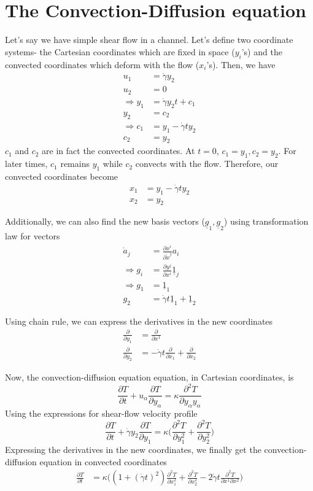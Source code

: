 \documentclass[11pt, letterpaper]{article}
\newcommand{\1}{\bm{1}}
\newcommand{\gd}{\dot \gamma}
\newcommand{\pd}[2]{\frac{\partial #1}{\partial #2}}
\newcommand{\vect}[1]{\underline{#1}} %
\newcommand{\p}[1]{\grave{#1}} %
\begin{document}
\section{The Convection-Diffusion equation}

Let's say we have simple shear flow in a channel. Let's define two coordinate systems- the Cartesian coordinates which are fixed in space ($y_i$'s) and the convected coordinates which deform with the flow ($x_i$'s). Then, we have
\begin{align*}
u_1 &= \gd y_2\\
u_2 &= 0 \\
\Rightarrow y_1 &= \gd y_2 t + c_1 \\
y_2 &= c_2 \\
\Rightarrow c_1 &= y_1 - \gd t y_2 \\
c_2 &= y_2
\end{align*}
$c_1$ and $c_2$ are in fact the convected coordinates. At $t=0$, $c_1=y_1, c_2=y_2$. For later times, $c_1$ remains $y_1$ while $c_2$ convects with the flow. Therefore, our convected coordinates become
\begin{align*}
x_1 &= y_1 - \gd t y_2 \\
x_2 &= y_2
\end{align*}

Additionally, we can also find the new basis vectors ($\vect g_1,\vect g_2$) using transformation law for vectors
\begin{align*}
\p a_j &= \pd{x^i}{\p x^j} a_i\\
\Rightarrow g_i &= \pd{y^j}{x^i} \vect{1}_j\\
\Rightarrow g_1 &= \vect{1}_1\\
 g_2 &= \gd t\vect{1}_1+\vect{1}_2
\end{align*}

Using chain rule, we can express the derivatives in the new coordinates
\begin{align*}
\pd{}{y_1} &= \pd{}{x^1}\\
\pd{}{y_2} &= -\gd t \pd{}{x_1} + \pd{}{x_2} 
\end{align*}

Now, the convection-diffusion equation equation, in Cartesian coordinates, is 
$$
\pd{T}{t} + u_\alpha\pd{T}{y_\alpha} = \kappa \pd{^2T}{y_\alpha y_\alpha} 
$$
Using the expressions for shear-flow velocity profile
$$
\pd{T}{t} + \gd y_2 \pd{T}{y_1} = \kappa \bigg(\pd{^2T}{y_1^2}+\pd{^2T}{y_2^2}\bigg) 
$$
Expressing the derivatives in the new coordinates, we finally get the convection-diffusion equation in convected coordinates
\begin{align*}
\pd{T}{t} &= \kappa \bigg((1+(\gd t)^2)\pd{^2T}{x_1^2}+\pd{^2T}{x_2^2} - 2\gd t \pd{^2T}{x^1 \partial x^2} \bigg) \\
\end{align*}
\end{document}
